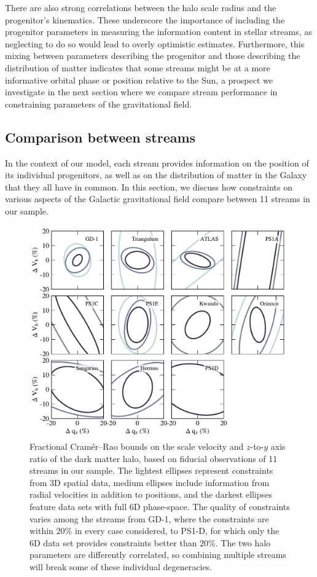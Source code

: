 \documentclass[modern]{aastex62}
\begin{document}
There are also strong correlations between the halo scale radius and the progenitor's kinematics.
These underscore the importance of including the progenitor parameters in measuring the information content in stellar streams, as neglecting to do so would lead to overly optimistic estimates.
Furthermore, this mixing between parameters describing the progenitor and those describing the distribution of matter indicates that some streams might be at a more informative orbital phase or position relative to the Sun, a prospect we investigate in the next section where we compare stream performance in constraining parameters of the gravitational field.

\subsection{Comparison between streams}
\label{sec:res_comp}
In the context of our model, each stream provides information on the position of its individual progenitors, as well as on the distribution of matter in the Galaxy that they all have in common.
In this section, we discuss how constraints on various aspects of the Galactic gravitational field compare between 11 streams in our sample.

\begin{figure}
\begin{center}
\includegraphics[width=\textwidth]{crb2d_allstream.pdf}
\caption{Fractional Cram\'er--Rao bounds on the scale velocity and $z$-to-$y$ axis ratio of the dark matter halo, based on fiducial observations of 11 streams in our sample.
The lightest ellipses represent constraints from 3D spatial data, medium ellipses include information from radial velocities in addition to positions, and the darkest ellipses feature data sets with full 6D phase-space.
The quality of constraints varies among the streams from GD-1, where the constraints are within 20\% in every case considered, to PS1-D, for which only the 6D data set provides constraints better than 20\%.
The two halo parameters are differently correlated, so combining multiple streams will break some of these individual degeneracies.
}
\label{fig:crb2d_comparison}
\end{center}
\end{figure}
\end{document}

